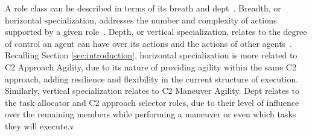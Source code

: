 A role class can be described in terms of its breath and dept~\cite{modelingAgentOrganizationsUsingRoles}. Breadth, or horizontal specialization, addresses the number and complexity of actions supported by a given role~\cite{modelingAgentOrganizationsUsingRoles}. Depth, or vertical specialization, relates to the degree of control an agent can have over its actions and the actions of other agents~\cite{modelingAgentOrganizationsUsingRoles}. Recalling Section \ref{sec:introduction}, horizontal specialization is more related to C2 Approach Agility, due to its nature of providing agility within the same C2 approach, adding resilience and flexibility in the current structure of execution. Similarly, vertical specialization relates to C2 Maneuver Agility. Dept relates to the task allocator and C2 approach selector roles, due to their level of influence over the remaining members while performing a maneuver or even which tasks they will execute.v
